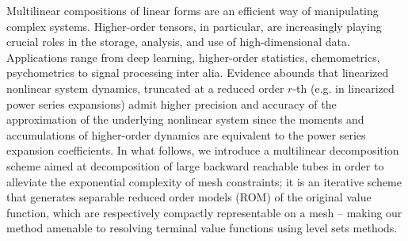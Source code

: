 \begin{comment}
Remark \autoref{rem:integral_conserve} informs us that HJ solutions obtained by integrating conservation law PDEs that possess discontinuous dynamics may lead to kinks in the HJ solutions\footnote{Since the integral of a discontinuity is a kink.}. For our proposed decomposition of BRS/BRT, if a  decomposed HJ PDE's solution (to be introduced shortly) develops kinks in its solution, a form of bang-bang control needs be considered if indeed the partial derivatives are discontinuous in those regions of the state space. If the conservation law does not develop a delta function, we can discount accounting for these discontinuities as the HJ solution will be continuous.  In the level set methods, to assure a monotone decrement in the value function, Lax-Friedrich schemes with carefully chosen artificial dissipation coefficients are used in computing solutions to the discretized Hamiltonian in order to account for constant or varying spatial dynamics\footnote{Although in the level sets toolbox, dissipation coefficients are chosen with the assumption that the underlying dynamics are spatially constant; this is very limiting for environments with unpredictable dynamics.} and alleviate possible numerical inconsistencies in computed gradients to the HJ PDE\footnote{This is discussed at length in ~\cite[\S5.3.1]{LevelSetsBook}.}.
\end{comment} 


Multilinear compositions of linear forms are an efficient way of manipulating complex systems.   Higher-order tensors, in particular, are increasingly playing crucial roles in the storage, analysis, and use of high-dimensional data. Applications range from deep learning, higher-order statistics, chemometrics, psychometrics to signal processing inter alia. Evidence abounds that linearized nonlinear system dynamics, truncated at a reduced order $r$-th (e.g. in linearized power series expansions\cite{iDG, JacobsonMayne, Mitter1966, McReynolds1967}) admit higher precision and accuracy of the approximation of the underlying nonlinear system since the moments and accumulations of higher-order dynamics are equivalent to the power series expansion coefficients.  In what follows, we introduce a multilinear decomposition scheme aimed at decomposition of large backward reachable tubes in order to alleviate the exponential complexity of mesh constraints; it is an iterative scheme that generates separable reduced order models (ROM) of the original value function, which are respectively compactly representable on a mesh -- making our method amenable to resolving terminal value functions using level sets methods. 


